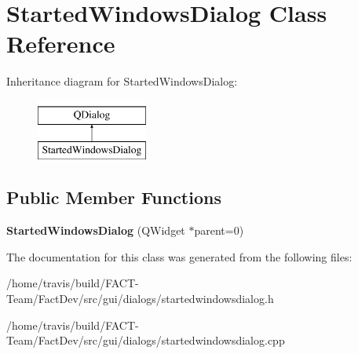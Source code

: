 \hypertarget{classStartedWindowsDialog}{\section{Started\-Windows\-Dialog Class Reference}
\label{classStartedWindowsDialog}
}
Inheritance diagram for Started\-Windows\-Dialog\-:\begin{figure}[H]
\begin{center}
\leavevmode
\includegraphics[height=2.000000cm]{da/ddc/classStartedWindowsDialog}
\end{center}
\end{figure}
\subsection*{Public Member Functions}
\begin{DoxyCompactItemize}
\item 
\hypertarget{classStartedWindowsDialog_a1625a8415425547dba138af7855c1a3d}{{\bfseries Started\-Windows\-Dialog} (Q\-Widget $\ast$parent=0)}\label{classStartedWindowsDialog_a1625a8415425547dba138af7855c1a3d}

\end{DoxyCompactItemize}


The documentation for this class was generated from the following files\-:\begin{DoxyCompactItemize}
\item 
/home/travis/build/\-F\-A\-C\-T-\/\-Team/\-Fact\-Dev/src/gui/dialogs/startedwindowsdialog.\-h\item 
/home/travis/build/\-F\-A\-C\-T-\/\-Team/\-Fact\-Dev/src/gui/dialogs/startedwindowsdialog.\-cpp\end{DoxyCompactItemize}
